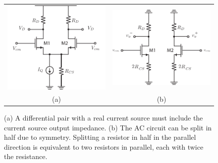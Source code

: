 \newpage
\begin{figure}[t]
\centering
\begin{tabular}{cc}
\includegraphics[scale=1]{Diff_Pair_CM_inputs} &
\includegraphics[scale=1]{Diff_Pair_AC_SS}\\
(a) & (b)\\
\end{tabular}
\caption{(a) A differential pair with a real current source must include the current source output impedance. (b) The AC circuit can be split in half due to symmetry.  Splitting a resistor in half in the parallel direction is equivalent to two resistors in parallel, each with twice the resistance.}
\label{fig:Diff_Pair_CM_inputs}
\end{figure}
